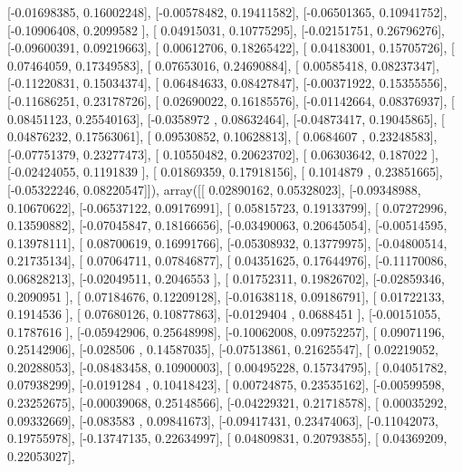 \documentclass{article}
\begin{document}
       [-0.01698385,  0.16002248],
       [-0.00578482,  0.19411582],
       [-0.06501365,  0.10941752],
       [-0.10906408,  0.2099582 ],
       [ 0.04915031,  0.10775295],
       [-0.02151751,  0.26796276],
       [-0.09600391,  0.09219663],
       [ 0.00612706,  0.18265422],
       [ 0.04183001,  0.15705726],
       [ 0.07464059,  0.17349583],
       [ 0.07653016,  0.24690884],
       [ 0.00585418,  0.08237347],
       [-0.11220831,  0.15034374],
       [ 0.06484633,  0.08427847],
       [-0.00371922,  0.15355556],
       [-0.11686251,  0.23178726],
       [ 0.02690022,  0.16185576],
       [-0.01142664,  0.08376937],
       [ 0.08451123,  0.25540163],
       [-0.0358972 ,  0.08632464],
       [-0.04873417,  0.19045865],
       [ 0.04876232,  0.17563061],
       [ 0.09530852,  0.10628813],
       [ 0.0684607 ,  0.23248583],
       [-0.07751379,  0.23277473],
       [ 0.10550482,  0.20623702],
       [ 0.06303642,  0.187022  ],
       [-0.02424055,  0.1191839 ],
       [ 0.01869359,  0.17918156],
       [ 0.1014879 ,  0.23851665],
       [-0.05322246,  0.08220547]]), array([[ 0.02890162,  0.05328023],
       [-0.09348988,  0.10670622],
       [-0.06537122,  0.09176991],
       [ 0.05815723,  0.19133799],
       [ 0.07272996,  0.13590882],
       [-0.07045847,  0.18166656],
       [-0.03490063,  0.20645054],
       [-0.00514595,  0.13978111],
       [ 0.08700619,  0.16991766],
       [-0.05308932,  0.13779975],
       [-0.04800514,  0.21735134],
       [ 0.07064711,  0.07846877],
       [ 0.04351625,  0.17644976],
       [-0.11170086,  0.06828213],
       [-0.02049511,  0.2046553 ],
       [ 0.01752311,  0.19826702],
       [-0.02859346,  0.2090951 ],
       [ 0.07184676,  0.12209128],
       [-0.01638118,  0.09186791],
       [ 0.01722133,  0.1914536 ],
       [ 0.07680126,  0.10877863],
       [-0.0129404 ,  0.0688451 ],
       [-0.00151055,  0.1787616 ],
       [-0.05942906,  0.25648998],
       [-0.10062008,  0.09752257],
       [ 0.09071196,  0.25142906],
       [-0.028506  ,  0.14587035],
       [-0.07513861,  0.21625547],
       [ 0.02219052,  0.20288053],
       [-0.08483458,  0.10900003],
       [ 0.00495228,  0.15734795],
       [ 0.04051782,  0.07938299],
       [-0.0191284 ,  0.10418423],
       [ 0.00724875,  0.23535162],
       [-0.00599598,  0.23252675],
       [-0.00039068,  0.25148566],
       [-0.04229321,  0.21718578],
       [ 0.00035292,  0.09332669],
       [-0.083583  ,  0.09841673],
       [-0.09417431,  0.23474063],
       [-0.11042073,  0.19755978],
       [-0.13747135,  0.22634997],
       [ 0.04809831,  0.20793855],
       [ 0.04369209,  0.22053027],
\end{document}
